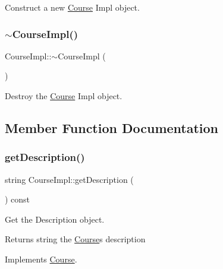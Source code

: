 Construct a new \hyperlink{classCourse}{Course} Impl object. 

\mbox{\label{classCourseImpl_a113b20eec8d5dbd8ce66e596ff467477}} 
\subsubsection{\texorpdfstring{$\sim$\+Course\+Impl()}{~CourseImpl()}}
{\footnotesize\ttfamily Course\+Impl\+::$\sim$\+Course\+Impl (\begin{DoxyParamCaption}{ }\end{DoxyParamCaption})}



Destroy the \hyperlink{classCourse}{Course} Impl object. 



\subsection{Member Function Documentation}
\mbox{\label{classCourseImpl_adff450841bfdf955061e01088d67f948}} 
\subsubsection{\texorpdfstring{get\+Description()}{getDescription()}}
{\footnotesize\ttfamily string Course\+Impl\+::get\+Description (\begin{DoxyParamCaption}{ }\end{DoxyParamCaption}) const\hspace{0.3cm}{\ttfamily [virtual]}}



Get the Description object. 

\begin{DoxyReturn}{Returns}
string the \hyperlink{classCourse}{Course}\textquotesingle{}s description 
\end{DoxyReturn}


Implements \hyperlink{classCourse_a19bced7786d959ca6110afc6d00bc751}{Course}.

\mbox{\label{classCourseImpl_ab1f1244e63d4d2938f1640d7ef308319}} 

